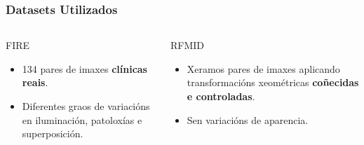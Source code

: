 \documentclass[xcolor=dvipsnames]{beamer}
\begin{document}
\begin{frame}
    \frametitle{Datasets Utilizados}

    \begin{columns}
        \begin{column}{0.5\textwidth}
            \begin{block}{FIRE}
                \begin{itemize}
                    \item 134 pares de imaxes \textbf{clínicas reais}.
                    \item Diferentes graos de variacións en iluminación, patoloxías e superposición.
                \end{itemize}
            \end{block}
        \end{column}
        \begin{column}{0.5\textwidth}
            \begin{block}{RFMID}
                \begin{itemize}
                    \item Xeramos pares de imaxes aplicando transformacións xeométricas \textbf{coñecidas e controladas}.
                    \item Sen variacións de aparencia.
                \end{itemize}
            \end{block}
        \end{column}
    \end{columns}

    \vspace{0.1cm}


\end{frame}
\end{document}
